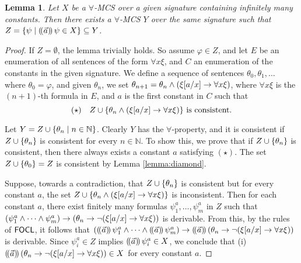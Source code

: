 \documentclass{article}
\newtheorem{lemma}{Lemma}
\begin{document}
\begin{lemma}
\label{lemma:lindy}
Let $X$ be a $\forall$-MCS over a given signature containing infinitely many constants. Then there exists a $\forall$-MCS $Y$ over the same signature such that $Z=\{\psi \mid (\!( \vec{a} )\!)\, \psi \in X\} \subseteq Y$.
\end{lemma}
\begin{proof}
If $Z = \emptyset$, the lemma trivially holds. %
So assume $\varphi \in Z$, and let $E$ be an enumeration of all sentences of the form $\forall x \xi$, and $C$ an enumeration of the constants in the given signature. We define a sequence of sentences $\theta_0, \theta_1, \ldots$ where $\theta_0 = \varphi$, and given $\theta_n$, we set $\theta_{n+1} = \theta_n \land (\xi[a/x] \to \forall x \xi)$, where $\forall x \xi$ is the $(n+1)$-th formula in $E$, and $a$ is the first constant in $C$ such that $$(\star)\quad Z \cup \{\theta_n \land (\xi[a/x] \to \forall x \xi)\} \text{ is consistent.}$$

Let $Y = Z \cup \{\theta_n \mid n \in \mathbb{N}\}$. Clearly $Y$ has the $\forall$-property, and it is consistent if $Z \cup \{\theta_n\}$ is consistent for every $n \in \mathbb{N}$. To show this, we prove that if $Z \cup \{\theta_n\}$ is consistent, then there always exists a constant $a$ satisfying $(\star)$. The set $Z \cup \{\theta_0\} = Z$ is consistent by Lemma \ref{lemma:diamond}. %

Suppose, towards a contradiction, that $Z \cup \{\theta_n\}$ is consistent but for every constant $a$, the set $Z \cup \{\theta_n \land (\xi[a/x] \to \forall x \xi)\}$ is inconsistent. Then for each constant $a$, there exist finitely many formulas $\psi_1^a, \ldots, \psi_m^a$ in $Z$ such that $(\psi_1^a \land \cdots \land \psi_m^a) \to (\theta_n \to \neg(\xi[a/x] \to \forall x \xi))$ is derivable. From this, by the rules of $\mathsf{FOCL}$, it follows that $((\!( \vec{a} )\!)\, \psi_1^a \land \cdots \land (\!( \vec{a} )\!)\, \psi_m^a) \to (\!( \vec{a} )\!)\,(\theta_n \to \neg(\xi[a/x] \to \forall x \xi))$ is derivable. Since $\psi_i^a \in Z$ implies $(\!( \vec{a} )\!)\, \psi_i^a \in X$, we conclude that (i) $(\!( \vec{a} )\!)\,(\theta_n \to \neg(\xi[a/x] \to \forall x \xi)) \in X$ for every constant $a$.


\end{proof}
\end{document}
